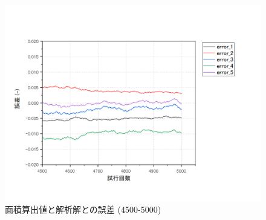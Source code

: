 \documentclass[12pt,a4paper]{jsarticle}
\begin{document}
\begin{figure}[htbp]
    \begin{center}
        \includegraphics[width=150mm]{Graph/error_4500-5000.png}
        \caption{面積算出値と解析解との誤差 (4500-5000)}
    \end{center}
\end{figure}

\newpage
\end{document}

